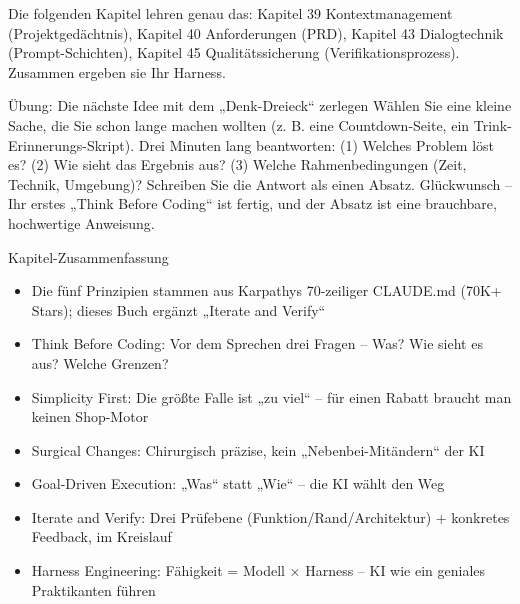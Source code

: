 Die folgenden Kapitel lehren genau das: Kapitel 39 Kontextmanagement (Projektgedächtnis), Kapitel 40 Anforderungen (PRD), Kapitel 43 Dialogtechnik (Prompt-Schichten), Kapitel 45 Qualitätssicherung (Verifikationsprozess). Zusammen ergeben sie Ihr Harness.

\begin{tcbpractice}{Übung: Die nächste Idee mit dem „Denk-Dreieck“ zerlegen}
Wählen Sie eine kleine Sache, die Sie schon lange machen wollten (z. B. eine Countdown-Seite, ein Trink-Erinnerungs-Skript). Drei Minuten lang beantworten: (1) Welches Problem löst es? (2) Wie sieht das Ergebnis aus? (3) Welche Rahmenbedingungen (Zeit, Technik, Umgebung)? Schreiben Sie die Antwort als einen Absatz. Glückwunsch – Ihr erstes „Think Before Coding“ ist fertig, und der Absatz ist eine brauchbare, hochwertige Anweisung.

\end{tcbpractice}

\begin{tcbsummary}{Kapitel-Zusammenfassung}
\begin{itemize}
  \item Die fünf Prinzipien stammen aus Karpathys 70-zeiliger CLAUDE.md (70K+ Stars); dieses Buch ergänzt „Iterate and Verify“
  \item Think Before Coding: Vor dem Sprechen drei Fragen – Was? Wie sieht es aus? Welche Grenzen?
  \item Simplicity First: Die größte Falle ist „zu viel“ – für einen Rabatt braucht man keinen Shop-Motor
  \item Surgical Changes: Chirurgisch präzise, kein „Nebenbei-Mitändern“ der KI
  \item Goal-Driven Execution: „Was“ statt „Wie“ – die KI wählt den Weg
  \item Iterate and Verify: Drei Prüfebene (Funktion/Rand/Architektur) + konkretes Feedback, im Kreislauf
  \item Harness Engineering: Fähigkeit = Modell × Harness – KI wie ein geniales Praktikanten führen
\end{itemize}

\end{tcbsummary}

